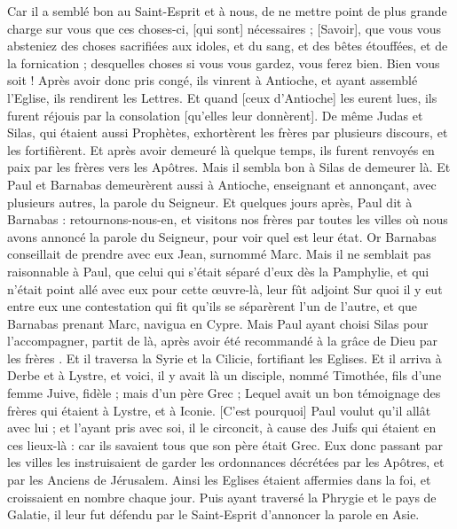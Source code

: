 \begin{multicols}{2}
Car il a semblé bon au Saint-Esprit et à nous, de ne mettre point de plus grande charge sur vous que ces choses-ci, [qui sont] nécessaires ;
[Savoir], que vous vous absteniez des choses sacrifiées aux idoles, et du sang, et des bêtes étouffées, et de la fornication ; desquelles choses si vous vous gardez, vous ferez bien. Bien vous soit !
Après avoir donc pris congé, ils vinrent à Antioche, et ayant assemblé l'Eglise, ils rendirent les Lettres.
Et quand [ceux d'Antioche] les eurent lues, ils furent réjouis par la consolation [qu'elles leur donnèrent].
De même Judas et Silas, qui étaient aussi Prophètes, exhortèrent les frères par plusieurs discours, et les fortifièrent.
Et après avoir demeuré là quelque temps, ils furent renvoyés en paix par les frères vers les Apôtres.
Mais il sembla bon à Silas de demeurer là.
Et Paul et Barnabas demeurèrent aussi à Antioche, enseignant et annonçant, avec plusieurs autres, la parole du Seigneur.
Et quelques jours après, Paul dit à Barnabas : retournons-nous-en, et visitons nos frères par toutes les villes où nous avons annoncé la parole du Seigneur, pour voir quel est leur état.
Or Barnabas conseillait de prendre avec eux Jean, surnommé Marc.
Mais il ne semblait pas raisonnable à Paul, que celui qui s'était séparé d'eux dès la Pamphylie, et qui n'était point allé avec eux pour cette œuvre-là, leur fût adjoint
Sur quoi il y eut entre eux une contestation qui fit qu'ils se séparèrent l'un de l'autre, et que Barnabas prenant Marc, navigua en Cypre.
Mais Paul ayant choisi Silas pour l'accompagner, partit de là, après avoir été recommandé à la grâce de Dieu par les frères .
Et il traversa la Syrie et la Cilicie, fortifiant les Eglises.
\VerseOne{}Et il arriva à Derbe et à Lystre, et voici, il y avait là un disciple, nommé Timothée, fils d'une femme Juive, fidèle ; mais d'un père Grec ;
Lequel avait un bon témoignage des frères qui étaient à Lystre, et à Iconie.
[C'est pourquoi] Paul voulut qu'il allât avec lui ; et l'ayant pris avec soi, il le circoncit, à cause des Juifs qui étaient en ces lieux-là : car ils savaient tous que son père était Grec.
Eux donc passant par les villes les instruisaient de garder les ordonnances décrétées par les Apôtres, et par les Anciens de Jérusalem.
Ainsi les Eglises étaient affermies dans la foi, et croissaient en nombre chaque jour.
Puis ayant traversé la Phrygie et le pays de Galatie, il leur fut défendu par le Saint-Esprit d'annoncer la parole en Asie.

\end{multicols}
